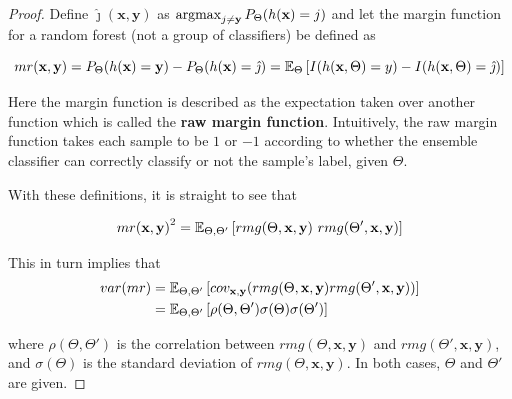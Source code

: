 \begin{proof}
	Define $\hat{\jmath}( \textbf{x},\textbf{y})$ as $\operatorname*{argmax}_{j \neq \textbf{y}} P_{\Theta}(h(\textbf{x}) = j)$ and let the margin function for a random forest (not a group of classifiers) be defined as

	\[\label{eq:rf-marginFunRf}
	mr(\textbf{x},\textbf{y}) = P_{\Theta}(h(\textbf{x}) = \textbf{y}) - P_{\Theta}(h(\textbf{x}) = \hat{\jmath})
	\\
	= \operatorname{\mathbb{E}}_{\Theta} \left[ I(h(\textbf{x},\Theta ) = y ) - I( h( \textbf{x},\Theta ) = \hat{\jmath} ) \right]
	\]




	Here the margin function is described as the expectation taken over another function which is called the \textbf{raw margin function}\label{eq:rf-rawMarginFun}. Intuitively, the raw margin function takes each sample to be $1$ or $-1$ according to whether the ensemble classifier can correctly classify or not the sample's label, given $\Theta$.

	With these definitions, it is straight to see that

            \begin{equation}
            {mr( \textbf{x},\textbf{y} )}^2 = \Expect_{\Theta, \Theta'} \left[ rmg( \Theta,\textbf{x},\textbf{y} ) \ rmg(\Theta',\textbf{x},\textbf{y} ) \right]
            \end{equation}


	This in turn implies that
            \begin{equation}\label{eq:rf-marginFunVar}
	            \begin{split}
	            var(mr) & = \operatorname{\mathbb{E}}_{\Theta, \Theta'}
	            \left[
	            cov_{\textbf{x},\textbf{y}}
	            (rmg(\Theta,\textbf{x},\textbf{y} )rmg(\Theta',\textbf{x},\textbf{y} ))
	            \right] \\
	            & = \operatorname{\mathbb{E}}_{\Theta, \Theta'}
	            \left[
	            \rho(\Theta, \Theta')\sigma(\Theta)\sigma(\Theta')
	            \right]
	            \end{split}
            \end{equation}

	where $ \rho(\Theta, \Theta')$ is the correlation between $rmg(\Theta,\textbf{x},\textbf{y})$ and $rmg(\Theta',\textbf{x},\textbf{y})$, and $\sigma(\Theta)$ is the standard deviation of $rmg(\Theta,\textbf{x},\textbf{y})$. In both cases, $\Theta$ and $\Theta'$ are given.%


\end{proof}

